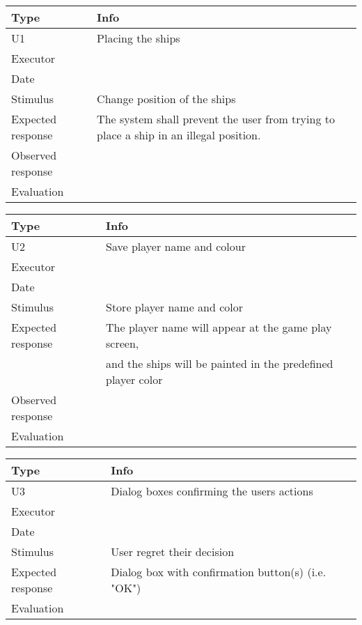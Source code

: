 \vspace{0.5em}

\noindent
\begin{tabular}{|p{3cm}|p{8.5cm}|}
	\hline
	\bf{Type}	& \bf{Info} \\
	\hline
	U1			& Placing the ships \\
	Executor	&  \\
	Date		& \date{\today} \\
	Stimulus	& Change position of the ships \\
	Expected response & The system shall prevent the user from trying to place a ship in an illegal position.\\
	Observed response & \\
	Evaluation	&  \\
	\hline
\end{tabular}

\vspace{0.5em}

\noindent
\begin{tabular}{|p{3cm}|p{8.5cm}|}
	\hline
	\bf{Type}	& \bf{Info} \\
	\hline
	U2			& Save player name and colour \\
	Executor	&  \\
	Date		& \date{\today} \\
	Stimulus	& Store player name and color \\
	Expected response & The player name will appear at the game play screen, \\
             & and the ships will be painted in the predefined player color  \\
	Observed response & \\
	Evaluation	&  \\
	\hline
\end{tabular}

\vspace{0.5em}

\noindent
\begin{tabular}{|p{3cm}|p{8.5cm}|}
	\hline
	\bf{Type}	& \bf{Info} \\
	\hline
	U3			& Dialog boxes confirming the users actions \\
	Executor	&  \\
	Date		& \date{\today} \\
	Stimulus	& User regret their decision \\
	Expected response & Dialog box with confirmation button(s) (i.e. "OK")\\
	Evaluation	&  \\
	\hline
\end{tabular}

